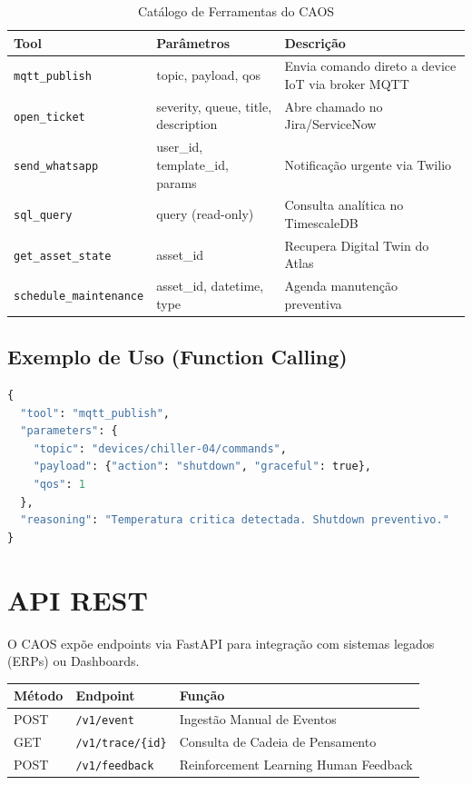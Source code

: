 \documentclass[12pt, a4paper]{article}
\begin{document}
\begin{table}[h!]
\centering
\small
\begin{tabular}{|l|l|p{6cm}|}
\hline
\textbf{Tool} & \textbf{Parâmetros} & \textbf{Descrição} \\ \hline
\texttt{mqtt\_publish} & topic, payload, qos & Envia comando direto a device IoT via broker MQTT \\ \hline
\texttt{open\_ticket} & severity, queue, title, description & Abre chamado no Jira/ServiceNow \\ \hline
\texttt{send\_whatsapp} & user\_id, template\_id, params & Notificação urgente via Twilio \\ \hline
\texttt{sql\_query} & query (read-only) & Consulta analítica no TimescaleDB \\ \hline
\texttt{get\_asset\_state} & asset\_id & Recupera Digital Twin do Atlas \\ \hline
\texttt{schedule\_maintenance} & asset\_id, datetime, type & Agenda manutenção preventiva \\ \hline
\end{tabular}
\caption{Catálogo de Ferramentas do CAOS}
\end{table}

\subsection{Exemplo de Uso (Function Calling)}

\begin{lstlisting}[language=Python, caption=Exemplo de Tool Call pelo LLM, basicstyle=\tiny\ttfamily]
{
  "tool": "mqtt_publish",
  "parameters": {
    "topic": "devices/chiller-04/commands",
    "payload": {"action": "shutdown", "graceful": true},
    "qos": 1
  },
  "reasoning": "Temperatura critica detectada. Shutdown preventivo."
}
\end{lstlisting}

\newpage

\section{API REST}
\label{sec:api}

O CAOS expõe endpoints via FastAPI para integração com sistemas legados (ERPs) ou Dashboards.

\begin{table}[h!]
\centering
\begin{tabular}{|l|l|l|}
\hline
\textbf{Método} & \textbf{Endpoint} & \textbf{Função} \\ \hline
POST & \texttt{/v1/event} & Ingestão Manual de Eventos \\ \hline
GET & \texttt{/v1/trace/\{id\}} & Consulta de Cadeia de Pensamento \\ \hline
POST & \texttt{/v1/feedback} & Reinforcement Learning Human Feedback \\ \hline
\end{tabular}
\end{table}
\end{document}

